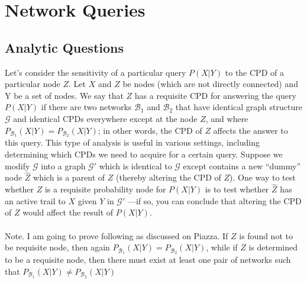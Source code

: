 \documentclass[12pt]{article}
\begin{document}
\section{Network Queries}
\subsection{Analytic Questions}
Let’s consider the sensitivity of a particular query $P(X|Y)$ to the CPD of a particular node $Z$.
Let $X$ and $Z$ be nodes (which are not directly connected) and Y be a set of nodes. We say that $Z$ has a requisite CPD for answering the query $P(X|Y)$ if there are two networks $\mathcal{B}_1$ and $\mathcal{B}_2$
that have identical graph structure $\mathcal{G}$ and identical CPDs everywhere except at the node $Z$, and
where $P_{\mathcal{B}_1}(X|Y) = P_{\mathcal{B}_2}(X|Y)$; in other words, the CPD of $Z$ aﬀects the answer to this query.
This type of analysis is useful in various settings, including determining which CPDs we need
to acquire for a certain query.
Suppose we modify $\mathcal{G}$ into a graph $\mathcal{G}'$
which is identical to $\mathcal{G}$ except contains a new ``dummy''
node $\hat{Z}$ which is a parent of $Z$ (thereby altering the CPD of $Z$). One way to test whether $Z$ is
a requisite probability node for $P(X|Y)$ is to test whether $\hat{Z}$ has an active trail to $X$ given $Y$
in $\mathcal{G}'$ 	—if so, you can conclude that altering the CPD of $Z$ would aﬀect the result of $P(X|Y)$.  \\ \\
		Note. I am going to prove following as  discussed on Piazza. If $Z$ is found not to be requisite node, then again $P_{\mathcal{B}_1}(X|Y) = P_{\mathcal{B}_2}(X|Y)$, while if $Z$ is determined to be a requisite node, then there must exist at least one pair of networks such that $P_{\mathcal{B}_1}(X|Y) \not = P_{\mathcal{B}_2}(X|Y)$
\end{document}
